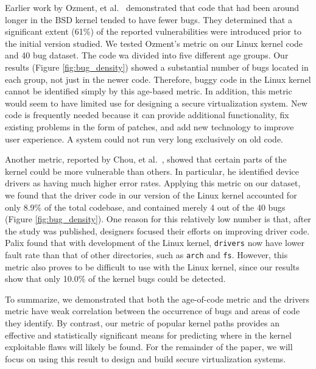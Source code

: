 Earlier work by Ozment, et al.~\cite{ozment2006milk} demonstrated that code that
had been around longer in the BSD kernel tended to have fewer bugs.
They determined that a significant extent (61\%) of the reported
vulnerabilities were
introduced prior to the initial version studied.
We tested Ozment's metric on our Linux kernel code and 40 bug dataset.
The code wa divided into five different age groups.
Our results (Figure \ref{fig:bug_density}) showed a substantial
number of bugs located in each group, not just in the newer code.
Therefore, buggy code in the Linux kernel cannot be identified simply
by this age-based metric.
In addition, this metric would seem to have limited use for designing a secure
virtualization system. New code is frequently needed because it can provide
additional functionality,
fix existing problems in the form of patches, and add new technology to improve
user experience. A system could not run very long exclusively on old code.

Another metric, reported by Chou, et al.~\cite{PittSFIeld}, showed that certain parts of the kernel
could be more vulnerable than others. In particular, he identified device drivers as
having much higher error rates.
Applying this metric on our dataset, we found that the driver code in our version
of the Linux kernel accounted for only 8.9\% of the total codebase, and contained
merely 4 out of the 40 bugs (Figure \ref{fig:bug_density}).
One reason for this relatively low number is that, after the study was published,
designers focused their efforts on improving driver code. Palix \cite{palix2011faults}
found that with development of the Linux kernel,
\texttt{drivers} now have lower fault rate than that of other directories,
such as \texttt{arch} and \texttt{fs}.
However, this metric also proves to be difficult to use with the
Linux kernel, since our results show that
only 10.0\% of the kernel bugs could be detected.

To summarize, we demonstrated that both the age-of-code metric and 
the drivers metric have weak correlation between the occurrence of bugs 
and areas of code they identify. By contrast, our metric of popular
kernel paths provides an effective and statistically significant
means for predicting where in the kernel exploitable flaws
will likely be found. For the remainder of the paper, we will
focus on using this result to design and build secure virtualization systems. 